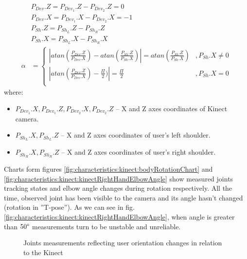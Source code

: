 \documentclass{llncs}
\begin{document}
\begin{equation}   
	\label{eq:characteristics:kinect:bodyRotationAngle}
	\begin{split}
		&P_{Dev}.Z = P_{{Dev}_1}.Z - P_{{Dev}_2}.Z = 0 \\
		&P_{Dev}.X = P_{{Dev}_1}.X - P_{{Dev}_2}.X = -1 \\
		&P_{Sh}.Z = P_{{Sh}_L}.Z - P_{{Sh}_R}.Z \\
		&P_{Sh}.X = P_{{Sh}_L}.X - P_{{Sh}_R}.X \\
		\alpha &= 
		\begin{cases} 
			|atan(\frac{P_{Dev}.Z}{P_{Dev}.X}) - atan(\frac{P_{Sh}.Z}{P_{Sh}.X})| = atan(\frac{P_{Sh}.Z}{P_{Sh}.X}) & , P_{Sh}.X \neq 0 \\
			|atan(\frac{P_{Dev}.Z}{P_{Dev}.X}) - \frac{\Pi}{2})| = \frac{\Pi}{2}                                    & , P_{Sh}.X = 0    \\		
		\end{cases}
	\end{split}
\end{equation}
where:
\begin{itemize}
	\item $P_{{Dev}_1}.X, P_{{Dev}_1}.Z, P_{{Dev}_2}.X, P_{{Dev}_2}.Z$ -- X and Z axes coordinates of Kinect camera.
	\item $P_{{Sh}_L}.X, P_{{Sh}_L}.Z$ -- X and Z axes coordinates of user's left shoulder.
	\item $P_{{Sh}_R}.X, P_{{Sh}_R}.Z$ -- X and Z axes coordinates of user's right shoulder.
\end{itemize}

Charts form figures \ref{fig:characteristics:kinect:bodyRotationChart} and \ref{fig:characteristics:kinect:kinectRightHandElbowAngle} show measured joints tracking states and elbow angle changes during rotation respectively. All the time, observed joint has been visible to the camera and its angle hasn't changed (rotation in ''T-pose''). As we can see in fig. \ref{fig:characteristics:kinect:kinectRightHandElbowAngle}, when angle is greater than $50 \degree$ measurements turn to be unstable and unreliable.

\begin{figure}[h!]			
	\begin{center}
	\end{center}				
	\caption{Joints measurements reflecting user orientation changes in relation to the Kinect}
	\label{fig:characteristics:kinect:orientationCharts}
\end{figure}
\end{document}
